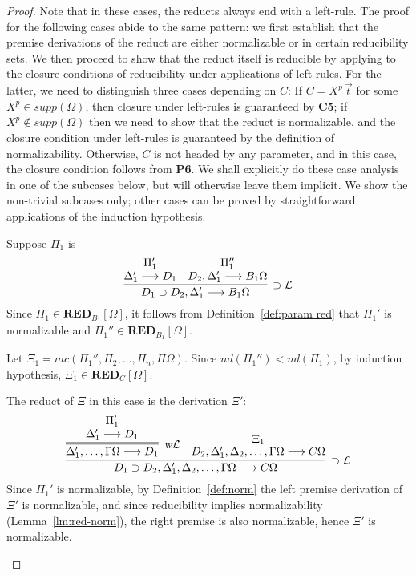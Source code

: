 \documentclass[preprint]{elsarticle}
\def\Lscr{{\mathcal L}}
\newcommand{\Seq}[2]{#1\longrightarrow #2}
\newcommand{\oimpL}{\oimp{\cal L}}
\newcommand{\oimp}{\supset}
\newcommand{\wL}{\hbox{\sl w}{\cal L}}
\def\RED{{\mathbf{RED}}}
\begin{document}
\begin{proof}
Note that in these cases, the reducts always end with a left-rule.
The proof for the following cases abide to the same pattern: we first
establish that the premise derivations of the reduct are either
normalizable or in certain reducibility sets. We then proceed to show
that the reduct itself is reducible by applying to the closure
conditions of reducibility under applications of left-rules.  For the
latter, we need to distinguish three cases depending on $C$: If $C =
X^p\,\vec t$ for some $X^p\in supp(\Omega)$, then closure under
left-rules is guaranteed by {\bf C5};
if $X^p \not \in supp(\Omega)$ then we need to show that the reduct
is normalizable, and the closure condition under left-rules is
guaranteed by the definition of normalizability. 
  Otherwise, $C$ is not headed by any parameter, and in this case,
the closure condition follows from {\bf  P6}.
We shall explicitly do these case analysis in one of the subcases
below, but will otherwise leave them implicit.  We show the
non-trivial subcases only; other cases can be proved by
straightforward applications of the induction hypothesis.

\begin{trivlist}
\item[\fbox{$\oimpL/\circ\Lscr$}] Suppose $\Pi_1$ is
$$
\infer[\oimpL] {\Seq{D_1 \oimp D_2,\Delta_1'}{B_1\Omega}} {
  \deduce{\Seq{\Delta_1'}{D_1}}{\Pi_1'} &
  \deduce{\Seq{D_2,\Delta_1'}{B_1\Omega}}{\Pi_1''} }
$$
Since $\Pi_1 \in \RED_{B_1}[\Omega]$, it follows from
Definition~\ref{def:param red} that $\Pi_1'$ is normalizable and
$\Pi_1'' \in \RED_{B_1}[\Omega]$.

Let $\Xi_1 = mc(\Pi_1'',\Pi_2,\ldots,\Pi_n,\Pi\Omega)$.  Since
$nd(\Pi_1'') < nd(\Pi_1)$, by induction hypothesis, $\Xi_1 \in
\RED_C[\Omega]$.

The reduct of $\Xi$ in this case is the derivation $\Xi'$:
\begin{displaymath}
  \infer[\oimpL]
  {\Seq{D_1 \oimp D_2,\Delta_1',\Delta_2,\ldots,\Gamma\Omega}{C\Omega}}
  {
    \infer=[\wL]
    {\Seq{\Delta_1',\ldots,\Gamma\Omega}{D_1}}
    {
      \deduce{\Seq{\Delta_1'}{D_1}}{\Pi_1'} 
    }
    &
    \deduce{\Seq{D_2,\Delta_1',\Delta_2,\ldots,\Gamma\Omega}{C\Omega}}
    {\Xi_1}
  }
\end{displaymath}
Since $\Pi_1'$ is normalizable, by Definition~\ref{def:norm} the left
premise derivation of $\Xi'$ is normalizable, and since reducibility
implies normalizability (Lemma~\ref{lm:red-norm}), the right premise
is also normalizable, hence $\Xi'$ is normalizable.


\end{trivlist}
\end{proof}
\end{document}
